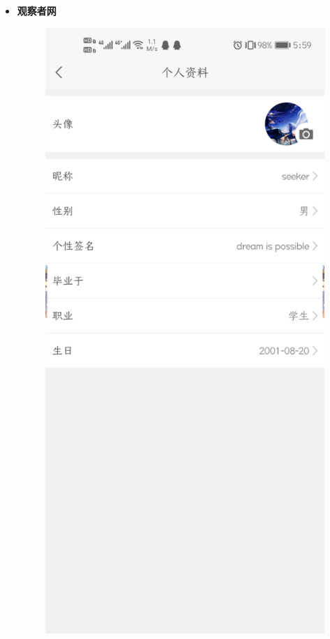\documentclass{article}
\begin{document}
\begin{itemize}
{\begin{figure}[h]
            \label{fig:1.2}
        \end{figure}
    }
\newpage
    \item {
        \bf{观察者网}\\
        \begin{figure}[h]
            \centering
            \includegraphics[scale=0.1]{1.3}

\end{figure}}
\end{itemize}
\end{document}
